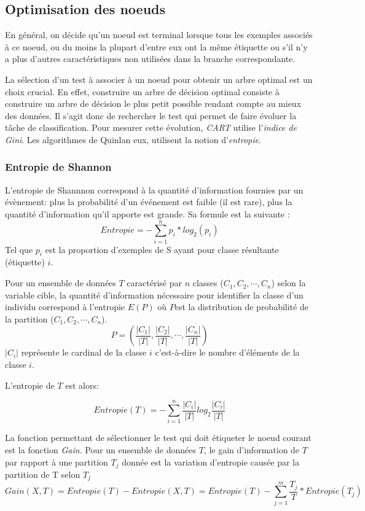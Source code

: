  \subsection{Optimisation des noeuds}
 
 En général, on décide qu'un noeud est terminal lorsque tous les exemples
 associés à ce noeud, ou du moins  la plupart d'entre eux ont la même étiquette
 ou s'il n'y a plus d'autres caractéristiques non utilisées dans la branche
 correspondante.

 La sélection d'un test à associer à un noeud pour obtenir un arbre optimal 
 est un choix crucial. En effet, construire un arbre de décision optimal
 consiste à construire un arbre de décision le plus petit possible rendant compte
 au mieux des données. Il s'agit donc de rechercher le test qui permet de faire
 évoluer la tâche de classification. Pour mesurer cette évolution, \textit{CART}
 utilise l'\textit{indice de Gini}. Les algorithmes de Quinlan eux, utilisent  la
 notion d'\textit{entropie}.

 \subsubsection{Entropie de Shannon}

L'entropie de Shannnon correspond à la quantité d'information fournies par un
évènement: plus la probabilité d’un événement est faible (il est rare), plus 
la quantité d’information qu’il apporte est grande. Sa formule est la
suivante
\cite{benjamin2005}:
$$  
Entropie = - \sum_{i=1}^{n} {p_i * log_2(p_i)}
$$ 
Tel que $p_i$ est la proportion d'exemples de S ayant pour classe résultante
(étiquette) $i$. 

Pour un ensemble de données $T$ caractérisé par $n$ classes ($C_1, C_2, \cdots,
C_n$) selon la variable cible, la quantité d'information nécessaire pour
identifier la classe d'un individu correspond à l'entropie $E(P)$ où $P$est la
distribution de probabilité de la partition ($C_1, C_2, \cdots, C_n$).
$$
P = (\frac{|C_1|}{|T|}, \frac{|C_2|}{|T|}, \cdots, \frac{|C_n|}{|T|})
$$
$|C_i|$ représente le cardinal de la classe $i$ c'est-à-dire le nombre
d'éléments de la classe $i$.

L'entropie de $T$ est alors:

$$
Entropie(T) = - \sum_{i=1}^{n}{\frac{|C_i|}{|T|} log_2\frac{|C_i|}{|T|}}
$$

La fonction permettant de sélectionner le test qui doit étiqueter le noeud
courant  est la fonction \textit{Gain}. Pour un ensemble de données $T$, le gain
d'information de $T$ par rapport à une partition $T_j$ donnée est la variation
d'entropie causée par la partition de T selon $T_j$
$$
Gain(X, T) = Entropie(T) - Entropie(X, T) = Entropie(T) - \sum_{j=1}^{m} {\frac{T_j}{T} * Entropie(T_j)}
$$

